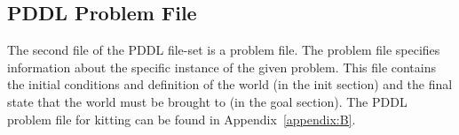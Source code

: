 \subsection{PDDL Problem File}\label{S:PDDL-problem}
The second file of the PDDL file-set is a  problem file. The problem file specifies information about the specific instance of the given problem. This file contains the initial conditions and definition of the world (in the init section) and the final state that the world must be brought to (in the goal section). The PDDL problem file for kitting can be found in Appendix~\ref{appendix:B}.



